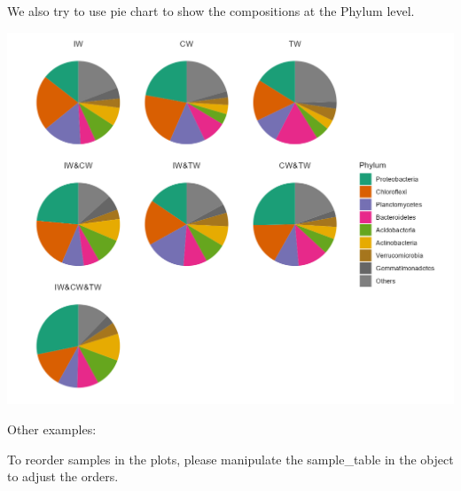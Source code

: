 \documentclass[
]{book}
\newenvironment{Shaded}{\begin{snugshade}}{\end{snugshade}}
\newcommand{\AttributeTok}[1]{\textcolor[rgb]{0.77,0.63,0.00}{#1}}
\newcommand{\DecValTok}[1]{\textcolor[rgb]{0.00,0.00,0.81}{#1}}
\newcommand{\FunctionTok}[1]{\textcolor[rgb]{0.00,0.00,0.00}{#1}}
\newcommand{\NormalTok}[1]{#1}
\newcommand{\OtherTok}[1]{\textcolor[rgb]{0.56,0.35,0.01}{#1}}
\newcommand{\SpecialCharTok}[1]{\textcolor[rgb]{0.00,0.00,0.00}{#1}}
\newcommand{\StringTok}[1]{\textcolor[rgb]{0.31,0.60,0.02}{#1}}
\begin{document}
We also try to use pie chart to show the compositions at the Phylum level.

\begin{Shaded}
\end{Shaded}

\begin{center}\includegraphics[width=800px]{Images/trans_venn_pie} \end{center}

Other examples:

To reorder samples in the plots, please manipulate the sample\_table in the object to adjust the orders.
\end{document}
